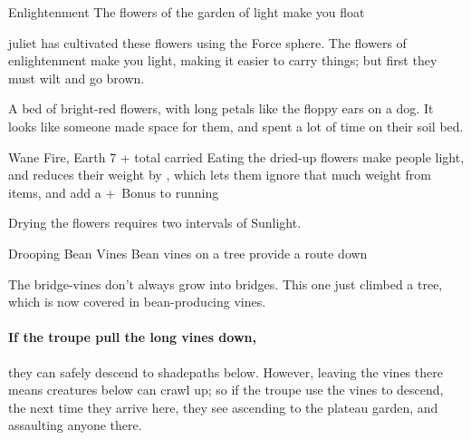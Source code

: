 


{Enlightenment}%
{The flowers of the garden of light make you float}%
\label{lightFlowers}


\Gls{juliet} has cultivated these flowers using the Force \gls{sphere}.
The flowers of enlightenment make you light, making it easier to carry things; but first they must wilt and go brown.

\begin{boxtext}
  A bed of bright-red flowers, with long petals like the floppy ears on a dog.
  It looks like someone made space for them, and spent a lot of time on their soil bed.
\end{boxtext}

\label{flowerOfEnlightenment}
  {}%
  {Wane}%
  {Fire, Earth}%
  {7 + total  carried}%
  {Eating the dried-up flowers make people light, and reduces their \gls{weight} by , which lets them ignore that much \gls{weight} from items, and add a +~Bonus to \gls{running}}%
  {\par%
    Drying the flowers requires two \glspl{interval} of Sunlight.
  }%

\showTalisman

{Drooping Bean Vines}%
{Bean vines on a tree provide a route down}%

The bridge-vines don't always grow into bridges.
This one just climbed a tree, which is now covered in bean-producing vines.

\paragraph{If the troupe pull the long vines down,}
they can safely descend to \gls{shadepaths} below.
However, leaving the vines there means creatures below can crawl up; so if the troupe use the vines to descend, the next time they arrive here, they see  ascending to the plateau garden, and assaulting anyone there.

